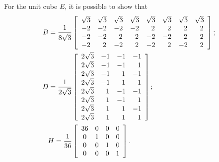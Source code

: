 \documentclass[a4paper]{article}
\begin{document}
\noindent
For the unit cube $E$,  it is possible to show that
\begin{align}
B = \frac{1}{8\sqrt{3}}&\left[\begin{array}{c c c c c c c c}
\sqrt{3} & \sqrt{3} & \sqrt{3} & \sqrt{3} & \sqrt{3} & \sqrt{3} & \sqrt{3} & \sqrt{3}\\
-2 & -2 & -2 & -2 & \ \ 2 & \ \ 2 & \ \ 2 & \ \ 2\\
-2 & -2 & \ \ 2 & \ \ 2 & -2 & -2 & \ \ 2 & \ \ 2\\
-2 & \ \ 2 & -2 & \ \ 2 & -2 & \ \ 2 & -2 & \ \ 2\\
\end{array}\right];\\
%
D = \frac{1}{2\sqrt{3}}&\left[\begin{array}{c c c c}
2\sqrt{3} & -1 & -1 & -1\\
2\sqrt{3} & -1 & -1 & \ \ 1\\
2\sqrt{3} & -1 & \ \ 1 & -1\\
2\sqrt{3} & -1 & \ \ 1 & \ \ 1\\
2\sqrt{3} & \ \ 1 & -1 & -1\\
2\sqrt{3} & \ \ 1 & -1 & \ \ 1\\
2\sqrt{3} & \ \ 1 & \ \ 1 & -1\\
2\sqrt{3} & \ \ 1 & \ \ 1 & \ \ 1
\end{array}\right];\\
%
H = \frac{1}{36}&\left[\begin{array}{c c c c}
36 & 0 & 0 & 0\\
0 & 1 & 0 & 0\\
0 & 0 & 1 & 0\\
0 & 0 & 0 & 1
\end{array}\right].
\end{align}
\end{document}
